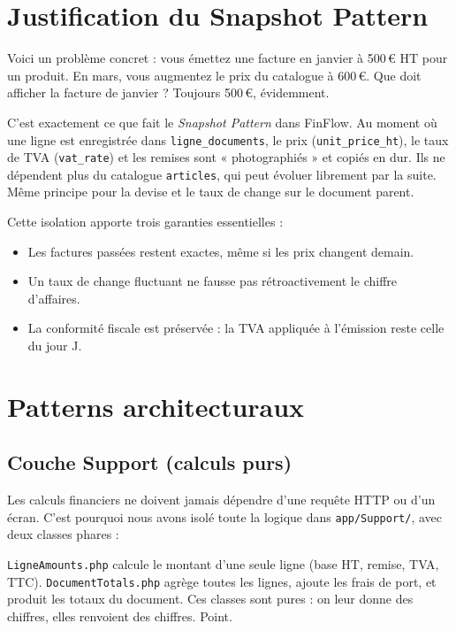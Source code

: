 \documentclass[12pt,a4paper]{report}
\begin{document}
\section{Justification du Snapshot Pattern}

Voici un problème concret : vous émettez une facture en janvier à 500\,€ HT pour un produit. En mars, vous augmentez le prix du catalogue à 600\,€. Que doit afficher la facture de janvier ? Toujours 500\,€, évidemment.

C'est exactement ce que fait le \textit{Snapshot Pattern} dans FinFlow. Au moment où une ligne est enregistrée dans \texttt{ligne\_documents}, le prix (\texttt{unit\_price\_ht}), le taux de TVA (\texttt{vat\_rate}) et les remises sont « photographiés » et copiés en dur. Ils ne dépendent plus du catalogue \texttt{articles}, qui peut évoluer librement par la suite. Même principe pour la devise et le taux de change sur le document parent.

Cette isolation apporte trois garanties essentielles :
\begin{itemize}[leftmargin=*]
    \item Les factures passées restent exactes, même si les prix changent demain.
    \item Un taux de change fluctuant ne fausse pas rétroactivement le chiffre d'affaires.
    \item La conformité fiscale est préservée : la TVA appliquée à l'émission reste celle du jour J.
\end{itemize}

\section{Patterns architecturaux}

\subsection{Couche Support (calculs purs)}

Les calculs financiers ne doivent jamais dépendre d'une requête HTTP ou d'un écran. C'est pourquoi nous avons isolé toute la logique dans \texttt{app/Support/}, avec deux classes phares :

\texttt{LigneAmounts.php} calcule le montant d'une seule ligne (base HT, remise, TVA, TTC). \texttt{DocumentTotals.php} agrège toutes les lignes, ajoute les frais de port, et produit les totaux du document. Ces classes sont pures : on leur donne des chiffres, elles renvoient des chiffres. Point.
\end{document}
